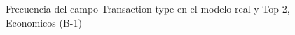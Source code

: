 \begin{figure}[H]
    \centering
    
    \caption{Frecuencia del campo Transaction type en el modelo real y Top 2, Economicos (B-1)}
    \label{frecuency-Transaction Type-top2}
\end{figure}